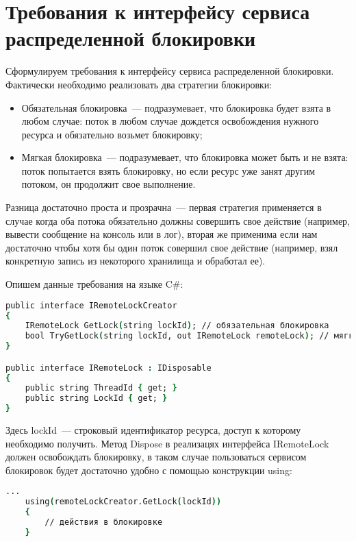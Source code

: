 \section{Требования к интерфейсу сервиса распределенной блокировки}

Сформулируем требования к интерфейсу сервиса распределенной блокировки. Фактически необходимо реализовать два стратегии блокировки:

\begin{itemize} 
	\item Обязательная блокировка~--- подразумевает, что блокировка будет взята в любом случае: поток в любом случае дождется освобождения нужного ресурса и обязательно возьмет блокировку;
	\item Мягкая блокировка~--- подразумевает, что блокировка может быть и не взята: поток попытается взять блокировку, но если ресурс уже занят другим потоком, он продолжит свое выполнение.
\end{itemize}

Разница достаточно проста и прозрачна~--- первая стратегия применяется в случае когда оба потока обязательно должны совершить свое действие (например, вывести сообщение на консоль или в лог), вторая же применима если нам достаточно чтобы хотя бы один поток совершил свое действие (например, взял конкретную запись из некоторого хранилища и обработал ее). 

Опишем данные требования на языке C\#:

\begin{lstlisting}[language=csh,caption={Описание интерфейса}]
public interface IRemoteLockCreator
{
	IRemoteLock GetLock(string lockId); // обязательная блокировка
	bool TryGetLock(string lockId, out IRemoteLock remoteLock); // мягкая блокировка
}

public interface IRemoteLock : IDisposable
{
	public string ThreadId { get; }
	public string LockId { get; }
}
\end{lstlisting}

Здесь lockId~--- строковый идентификатор ресурса, доступ к которому необходимо получить. Метод Dispose в реализацях интерфейса IRemoteLock должен освобождать блокировку, в таком случае пользоваться сервисом блокировок будет достаточно удобно с помощью конструкции using:

\begin{lstlisting}[language=csh,caption={Использование конструкции using}]
	...
	using(remoteLockCreator.GetLock(lockId))
	{
		// действия в блокировке
	}
\end{lstlisting}